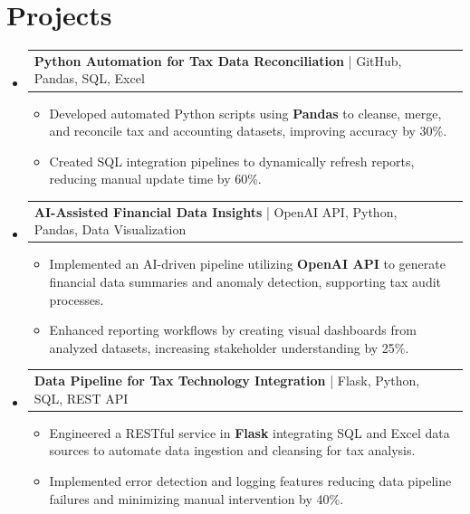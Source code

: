 \documentclass[letterpaper,11pt]{article}
\makeatletter
\newcommand{\resumeItem}[1]{
  \item\footnotesize{
    {#1 \vspace{-2pt}}
  }
}
\newcommand{\resumeProjectHeading}[2]{
    \item
    \begin{tabular*}{1.001\textwidth}{l@{\extracolsep{\fill}}r}
      \small#1 & \textbf{\small #2}\\
    \end{tabular*}\vspace{-7pt}
}
\newcommand{\resumeSubHeadingListStart}{\begin{itemize}[leftmargin=0pt, label={}]}
\newcommand{\resumeSubHeadingListEnd}{\end{itemize}}
\newcommand{\resumeItemListStart}{\begin{itemize}[leftmargin=*]}
\newcommand{\resumeItemListEnd}{\end{itemize}\vspace{-5pt}}
\makeatother
\begin{document}
\section{Projects}
    \vspace{-5pt}
    \resumeSubHeadingListStart
          \resumeProjectHeading
              {\textbf{Python Automation for Tax Data Reconciliation} | GitHub, Pandas, SQL, Excel}{}
        \resumeItemListStart
            \resumeItem{Developed automated Python scripts using \textbf{Pandas} to cleanse, merge, and reconcile tax and accounting datasets, improving accuracy by 30\%.}
            \resumeItem{Created SQL integration pipelines to dynamically refresh reports, reducing manual update time by 60\%.}
        \resumeItemListEnd
        \vspace{-12pt}

    \resumeProjectHeading
        {\textbf{AI-Assisted Financial Data Insights} | OpenAI API, Python, Pandas, Data Visualization}{}
        \resumeItemListStart
            \resumeItem{Implemented an AI-driven pipeline utilizing \textbf{OpenAI API} to generate financial data summaries and anomaly detection, supporting tax audit processes.}
            \resumeItem{Enhanced reporting workflows by creating visual dashboards from analyzed datasets, increasing stakeholder understanding by 25\%.}
        \resumeItemListEnd
          \vspace{-12pt}

      \resumeProjectHeading
          {\textbf{Data Pipeline for Tax Technology Integration} | Flask, Python, SQL, REST API}{}
          \resumeItemListStart
              \resumeItem{Engineered a RESTful service in \textbf{Flask} integrating SQL and Excel data sources to automate data ingestion and cleansing for tax analysis.}
              \resumeItem{Implemented error detection and logging features reducing data pipeline failures and minimizing manual intervention by 40\%.}
          \resumeItemListEnd 
    \resumeSubHeadingListEnd
\end{document}
